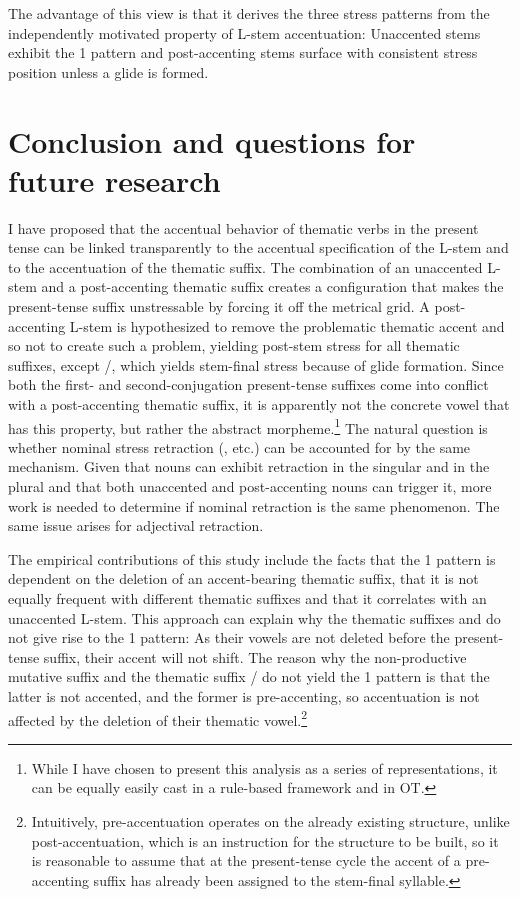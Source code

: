 \documentclass[output=paper,colorlinks,citecolor=black,koreanfont]{langscibook}
\begin{document}
The advantage of this view is that it derives the three stress patterns from the independently motivated property of L-stem accentuation: Unaccented stems exhibit the {1\SG} pattern and post-accenting stems surface with consistent stress position unless a glide is formed.

\section{Conclusion and questions for future research}\label{mat:sec:Conclusion}

I have proposed that the accentual behavior of thematic verbs in the present tense can be linked transparently to the accentual specification of the L-stem and to the accentuation of the thematic suffix. The combination of an unaccented L-stem and a post-accenting thematic suffix creates a configuration that makes the present-tense suffix unstressable by forcing it off the metrical grid. A post-accenting L-stem is hypothesized to remove the problematic thematic accent and so not to create such a problem, yielding post-stem stress for all thematic suffixes, except /, which yields stem-final stress because of glide formation. Since both the first- and second-conjugation present-tense suffixes come into conflict with a post-accenting thematic suffix, it is apparently not the concrete vowel that has this property, but rather the abstract morpheme.\footnote{While I have chosen to present this analysis as a series of representations, it can be equally easily cast in a rule-based framework and in OT.} The natural question is whether nominal stress retraction (\citealt{Halle1973,Halle1975,Halle1997,Melvold1989,Revithiadou1999,Alderete1999,Butska2002,mat:Dubina2012,Osadcha2019}, etc.) can be accounted for by the same mechanism. Given that nouns can exhibit retraction in the singular and in the plural and that both unaccented and post-accenting nouns can trigger it, more work is needed to determine if nominal retraction is the same phenomenon. The same issue arises for adjectival retraction.

The empirical contributions of this study include the facts that the {1\SG} pattern is dependent on the deletion of an accent-bearing thematic suffix, that it is not equally frequent with different thematic suffixes and that it correlates with an unaccented L-stem. This approach can explain why the thematic suffixes  and  do not give rise to the {1\SG} pattern: As their vowels are not deleted before the present-tense suffix, their accent will not shift. The reason why the non-productive mutative suffix  and the thematic suffix / do not yield the {1\SG} pattern is that the latter is not accented, and the former is pre-accenting, so accentuation is not affected by the deletion of their thematic vowel.\footnote{Intuitively, pre-accentuation operates on the already existing structure, unlike post-accentuation, which is an instruction for the structure to be built, so it is reasonable to assume that at the present-tense cycle the accent of a pre-accenting suffix has already been assigned to the stem-final syllable.}
\end{document}
